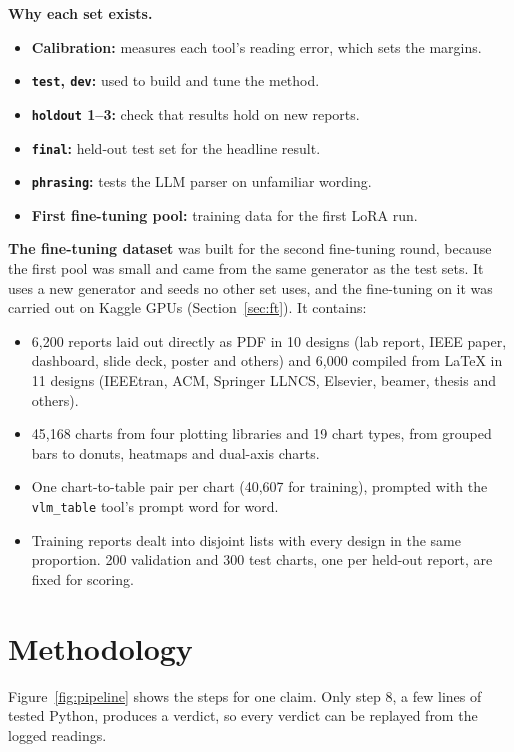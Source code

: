 \documentclass[11pt,a4paper]{article}
\newcommand{\code}[1]{\texttt{\small #1}}
\begin{document}
\textbf{Why each set exists.}
\begin{itemize}
\item \textbf{Calibration:} measures each tool's reading error, which sets the margins.
\item \textbf{\code{test}, \code{dev}:} used to build and tune the method.
\item \textbf{\code{holdout} 1--3:} check that results hold on new reports.
\item \textbf{\code{final}:} held-out test set for the headline result.
\item \textbf{\code{phrasing}:} tests the LLM parser on unfamiliar wording.
\item \textbf{First fine-tuning pool:} training data for the first LoRA run.
\end{itemize}

\textbf{The fine-tuning dataset} was built for the second fine-tuning round, because the first pool was small and came from the same generator as the test sets. It uses a new generator and seeds no other set uses, and the fine-tuning on it was carried out on Kaggle GPUs (Section~\ref{sec:ft}). It contains:
\begin{itemize}
\item 6{,}200 reports laid out directly as PDF in 10 designs (lab report, IEEE paper, dashboard, slide deck, poster and others) and 6{,}000 compiled from LaTeX in 11 designs (IEEEtran, ACM, Springer LLNCS, Elsevier, beamer, thesis and others).
\item 45{,}168 charts from four plotting libraries and 19 chart types, from grouped bars to donuts, heatmaps and dual-axis charts.
\item One chart-to-table pair per chart (40{,}607 for training), prompted with the \code{vlm\_table} tool's prompt word for word.
\item Training reports dealt into disjoint lists with every design in the same proportion. 200 validation and 300 test charts, one per held-out report, are fixed for scoring.
\end{itemize}

\section{Methodology}\label{sec:method}

Figure~\ref{fig:pipeline} shows the steps for one claim. Only step 8, a few lines of tested Python, produces a verdict, so every verdict can be replayed from the logged readings.
\end{document}
